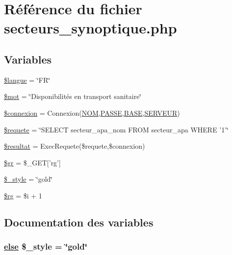 \hypertarget{secteurs__synoptique_8php}{
\section{R\'{e}f\'{e}rence du fichier secteurs\_\-synoptique.php}
\label{secteurs__synoptique_8php}
}
\subsection*{Variables}
\begin{CompactItemize}
\item 
\hyperlink{secteurs__synoptique_8php_a0}{\$langue} = \char`\"{}FR\char`\"{}
\item 
\hyperlink{secteurs__synoptique_8php_a1}{\$mot} = \char`\"{}Disponibilit\'{e}s en transport sanitaire\char`\"{}
\item 
\hyperlink{secteurs__synoptique_8php_a2}{\$connexion} = Connexion(\hyperlink{pma__connect_8php_a0}{NOM},\hyperlink{pma__connect_8php_a1}{PASSE},\hyperlink{pma__connect_8php_a3}{BASE},\hyperlink{pma__connect_8php_a2}{SERVEUR})
\item 
\hyperlink{secteurs__synoptique_8php_a3}{\$requete} = \char`\"{}SELECT secteur\_\-apa\_\-nom FROM secteur\_\-apa WHERE '1'\char`\"{}
\item 
\hyperlink{secteurs__synoptique_8php_a4}{\$resultat} = Exec\-Requete(\$requete,\$connexion)
\item 
\hyperlink{secteurs__synoptique_8php_a5}{\$gr} = \$\_\-GET\mbox{[}'rg'\mbox{]}
\item 
\hyperlink{secteurs__synoptique_8php_a6}{\$\_\-style} = \char`\"{}gold\char`\"{}
\item 
\hyperlink{secteurs__synoptique_8php_a7}{\$rg} = \$i + 1
\end{CompactItemize}


\subsection{Documentation des variables}
\hypertarget{secteurs__synoptique_8php_a6}{
\subsubsection[\$\_\-style]{\setlength{\rightskip}{0pt plus 5cm}\hyperlink{cron_8php_a9}{else} \$\_\-style = \char`\"{}gold\char`\"{}}}
\label{secteurs__synoptique_8php_a6}


